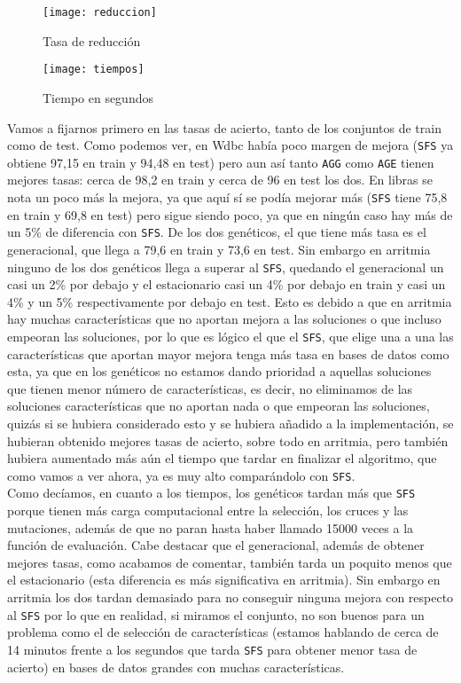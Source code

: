 \documentclass[12pt]{article}
\begin{document}
\begin{figure}[H]
\centering
\texttt{[image: reduccion]}
\caption{Tasa de reducción} \label{fig:reduccion}
\end{figure}

\begin{figure}[H]
\centering
\texttt{[image: tiempos]}
\caption{Tiempo en segundos} \label{fig:tiempos}
\end{figure}

Vamos a fijarnos primero en las tasas de acierto, tanto de los conjuntos de train como de test. Como podemos ver, en Wdbc había poco margen de mejora (\texttt{SFS} ya obtiene 97,15 en train y 94,48 en test) pero aun así tanto \texttt{AGG} como \texttt{AGE} tienen mejores tasas: cerca de 98,2 en train y cerca de 96 en test los dos. En libras se nota un poco más la mejora, ya que aquí sí se podía mejorar más (\texttt{SFS} tiene 75,8 en train y 69,8 en test) pero sigue siendo poco, ya que en ningún caso hay más de un 5\% de diferencia con \texttt{SFS}. De los dos genéticos, el que tiene más tasa es el generacional, que llega a 79,6 en train y 73,6 en test. Sin embargo en arritmia ninguno de los dos genéticos llega a superar al \texttt{SFS}, quedando el generacional un casi un 2\% por debajo y el estacionario casi un 4\% por debajo en train y casi un 4\% y un 5\% respectivamente por debajo en test. Esto es debido a que en arritmia hay muchas características que no aportan mejora a las soluciones o que incluso empeoran las soluciones, por lo que es lógico el que el \texttt{SFS}, que elige una a una las características que aportan mayor mejora tenga más tasa en bases de datos como esta, ya que en los genéticos no estamos dando prioridad a aquellas soluciones que tienen menor número de características, es decir, no eliminamos de las soluciones características que no aportan nada o que empeoran las soluciones, quizás si se hubiera considerado esto y se hubiera añadido a la implementación, se hubieran obtenido mejores tasas de acierto, sobre todo en arritmia, pero también hubiera aumentado más aún el tiempo que tardar en finalizar el algoritmo, que como vamos a ver ahora, ya es muy alto comparándolo con \texttt{SFS}.\\

Como decíamos, en cuanto a los tiempos, los genéticos tardan más que \texttt{SFS} porque tienen más carga computacional entre la selección, los cruces y las mutaciones, además de que no paran hasta haber llamado 15000 veces a la función de evaluación. Cabe destacar que el generacional, además de obtener mejores tasas, como acabamos de comentar, también tarda un poquito menos que el estacionario (esta diferencia es más significativa en arritmia). Sin embargo en arritmia los dos tardan demasiado para no conseguir ninguna mejora con respecto al \texttt{SFS} por lo que en realidad, si miramos el conjunto, no son buenos para un problema como el de selección de características (estamos hablando de cerca de 14 minutos frente a los segundos que tarda \texttt{SFS} para obtener menor tasa de acierto) en bases de datos grandes con muchas características.\\
\end{document}
